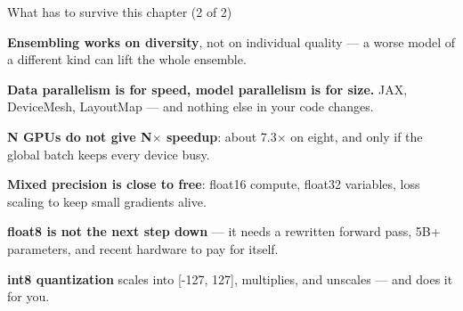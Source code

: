 \documentclass[aspectratio=169,11pt,t]{beamer}
\begin{document}
\begin{frame}[shrink=25]{What has to survive this chapter (2 of 2)}
\begin{isteps}
\item \textbf{Ensembling works on diversity}, not on individual quality --- a worse model of a different kind can lift the whole ensemble.
\item \textbf{Data parallelism is for speed, model parallelism is for size.} JAX, DeviceMesh, LayoutMap --- and nothing else in your code changes.
\item \textbf{N GPUs do not give N$\times$ speedup}: about 7.3$\times$ on eight, and only if the global batch keeps every device busy.
\item \textbf{Mixed precision is close to free}: float16 compute, float32 variables, loss scaling to keep small gradients alive.
\item \textbf{float8 is not the next step down} --- it needs a rewritten forward pass, 5B+ parameters, and recent hardware to pay for itself.
\item \textbf{int8 quantization} scales into [-127, 127], multiplies, and unscales --- and  does it for you.
\end{isteps}
\vskip 4pt
\vskip 2pt
\end{frame}
\end{document}
